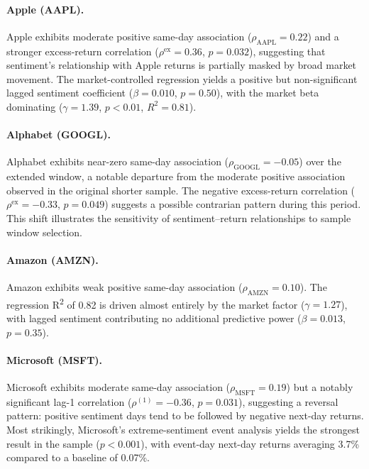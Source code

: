 \documentclass[lettersize,journal]{IEEEtran}
\begin{document}
\paragraph{Apple (AAPL).}
Apple exhibits moderate positive same-day association ($\rho_{\mathrm{AAPL}} = 0.22$) and a stronger excess-return correlation ($\rho^{\mathrm{ex}} = 0.36$, $p = 0.032$), suggesting that sentiment's relationship with Apple returns is partially masked by broad market movement. The market-controlled regression yields a positive but non-significant lagged sentiment coefficient ($\beta = 0.010$, $p = 0.50$), with the market beta dominating ($\gamma = 1.39$, $p < 0.01$, $R^2 = 0.81$).

\paragraph{Alphabet (GOOGL).}
Alphabet exhibits near-zero same-day association ($\rho_{\mathrm{GOOGL}} = -0.05$) over the extended window, a notable departure from the moderate positive association observed in the original shorter sample. The negative excess-return correlation ($\rho^{\mathrm{ex}} = -0.33$, $p = 0.049$) suggests a possible contrarian pattern during this period. This shift illustrates the sensitivity of sentiment--return relationships to sample window selection.

\paragraph{Amazon (AMZN).}
Amazon exhibits weak positive same-day association ($\rho_{\mathrm{AMZN}} = 0.10$). The regression R\textsuperscript{2} of 0.82 is driven almost entirely by the market factor ($\gamma = 1.27$), with lagged sentiment contributing no additional predictive power ($\beta = 0.013$, $p = 0.35$).

\paragraph{Microsoft (MSFT).}
Microsoft exhibits moderate same-day association ($\rho_{\mathrm{MSFT}} = 0.19$) but a notably significant lag-1 correlation ($\rho^{(1)} = -0.36$, $p = 0.031$), suggesting a reversal pattern: positive sentiment days tend to be followed by negative next-day returns. Most strikingly, Microsoft's extreme-sentiment event analysis yields the strongest result in the sample ($p < 0.001$), with event-day next-day returns averaging 3.7\% compared to a baseline of 0.07\%.
\end{document}
